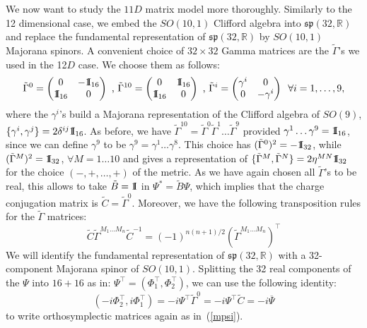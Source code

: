 \documentclass[a4paper,11pt]{article}
\def\Id{{\rm 1\kern-.28em I}}
\begin{document}
We now want to study the $11D$ matrix model more thoroughly. Similarly to the 12 dimensional case,
we embed the $SO(10,1)$ Clifford algebra into $\mathfrak{sp}(32,\mathbb{R})$ and replace the fundamental 
representation of $\mathfrak{sp}(32,\mathbb{R})$ by $SO(10,1)$ Majorana spinors.
A convenient choice of $32 \times 32$ Gamma matrices are the $\tilde{\Gamma}$'s we used in the 12$D$ case. 
We choose them as follows:
\begin{equation}
\tilde{\Gamma}^0=\begin{pmatrix}
0 & -\Id_{16} \\
\Id_{16} & 0 \\
\end{pmatrix}  \text{  ,  }
\tilde{\Gamma}^{10}=\begin{pmatrix}
0 & \Id_{16} \\
\Id_{16} & 0 \\
\end{pmatrix} \text{  ,  }
\tilde{\Gamma}^i=\begin{pmatrix}
\gamma^i & 0 \\
0 & -\gamma^i \\
\end{pmatrix}\phantom{a} \forall i = 1, \ldots, 9,
\end{equation}
where the $\gamma^i$'s build a Majorana representation of the
Clifford algebra of $SO(9)$, $\{\gamma^i,\gamma^j\} = 2
\delta^{ij} \Id_{16}$.
As before, we have $\tilde{\Gamma}^{10}= \tilde{\Gamma}^0 \tilde{\Gamma}^1
\ldots \tilde{\Gamma}^9$ provided $\gamma^1 \ldots \gamma^9 = \Id_{16}$, since
we can define $\gamma^9$ to be $\gamma^9 = \gamma^1 \ldots \gamma^8$.
This choice has $(\tilde{\Gamma}^0)^2=-\Id_{32}$, while $(\tilde{\Gamma}^M)^2=\Id_{32}$, 
$\forall M=1 \dots 10$ and gives a representation of $\{\tilde{\Gamma}^M,\tilde{\Gamma}^N\} = 2 \eta^{MN} \Id_{32}$ 
for the choice $(-,+,\ldots,+)$ of the metric. 
As we have again chosen all $\tilde{\Gamma}$'s to be real, this allows
to take $\tilde{B}=\Id$ in $\Psi^* = \tilde{B} \Psi$, which implies 
that the charge conjugation matrix is $\tilde{C}= \tilde{\Gamma}^{0}$.
Moreover, we have the following transposition rules for the $\tilde{\Gamma}$ matrices:
\begin{equation}\label{CGamn11}
\tilde{C} \tilde{\Gamma}^{M_1 \ldots M_n} \tilde{C}^{-1} = (-1)^{n(n+1)/2} 
(\tilde{\Gamma}^{M_1 \ldots M_n})^{\top}
\end{equation}
We will identify the fundamental representation of
$\mathfrak{sp}(32,\mathbb{R})$ with a 32-component Majorana
spinor of $SO(10,1)$. Splitting the 32 real components of the $\Psi$ into
$16+16$ as in:
$\Psi^{\top} = (\Phi_1^{\top},\Phi_2^{\top})$, we can use the following identity:
$$
(-i\Phi_2^{\top}, i\Phi_1^{\top}) = -i \Psi^{\top} \tilde{\Gamma}^0 = -i \Psi^{\top} \tilde{C} = -i \overline{\Psi}
$$
to write orthosymplectic matrices again as in~(\ref{mpsi}).
\end{document}

